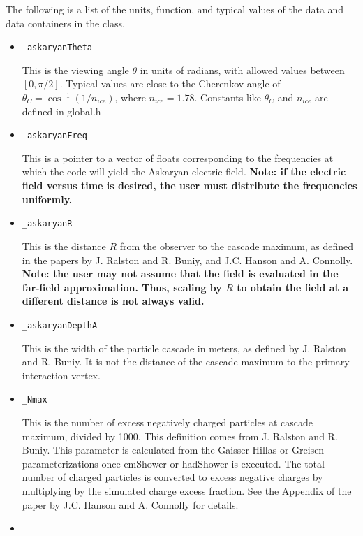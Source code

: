 \documentclass[10pt]{article}
\begin{document}
The following is a list of the units, function, and typical values of the data and data containers in the class.

\begin{itemize}
\item \begin{verbatim}
_askaryanTheta
\end{verbatim} This is the viewing angle $\theta$ in units of radians, with allowed values between $[0,\pi/2]$.  Typical values are close to the Cherenkov angle of $\theta_C = \cos^{-1}(1/n_{ice})$, where $n_{ice} = 1.78$.  Constants like $\theta_C$ and $n_{ice}$ are defined in global.h 
\item \begin{verbatim}
_askaryanFreq
\end{verbatim}
This is a pointer to a vector of floats corresponding to the frequencies at which the code will yield the Askaryan electric field.  \textbf{Note: if the electric field versus time is desired, the user must distribute the frequencies uniformly.}
\item \begin{verbatim}
_askaryanR
\end{verbatim}
This is the distance $R$ from the observer to the cascade maximum, as defined in the papers by J. Ralston and R. Buniy, and J.C. Hanson and A. Connolly.  \textbf{Note: the user may not assume that the field is evaluated in the far-field approximation.  Thus, scaling by $R$ to obtain the field at a different distance is not always valid.}
\item \begin{verbatim}
_askaryanDepthA
\end{verbatim}
This is the width of the particle cascade in meters, as defined by J. Ralston and R. Buniy.  It is not the distance of the cascade maximum to the primary interaction vertex.
\item \begin{verbatim}
_Nmax
\end{verbatim}
This is the number of excess negatively charged particles at cascade maximum, divided by 1000.  This definition comes from J. Ralston and R. Buniy.  This parameter is calculated from the Gaisser-Hillas or Greisen parameterizations once emShower or hadShower is executed.  The total number of charged particles is converted to excess negative charges by multiplying by the simulated charge excess fraction.  See the Appendix of the paper by J.C. Hanson and A. Connolly for details.
\item \begin{verbatim}

\end{verbatim}
\end{itemize}
\end{document}
